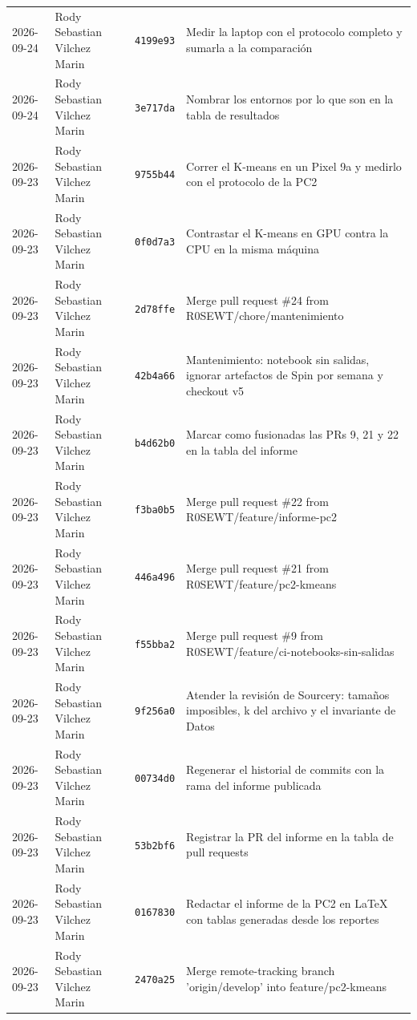 {\begin{xltabular}{\textwidth}{@{}L{2cm}L{2.9cm}L{1.5cm}Y@{}}
2026-09-24 & Rody Sebastian Vilchez Marin & \texttt{4199e93} & Medir la laptop con el protocolo completo y sumarla a la comparación \\
2026-09-24 & Rody Sebastian Vilchez Marin & \texttt{3e717da} & Nombrar los entornos por lo que son en la tabla de resultados \\
2026-09-23 & Rody Sebastian Vilchez Marin & \texttt{9755b44} & Correr el K-means en un Pixel 9a y medirlo con el protocolo de la PC2 \\
2026-09-23 & Rody Sebastian Vilchez Marin & \texttt{0f0d7a3} & Contrastar el K-means en GPU contra la CPU en la misma máquina \\
2026-09-23 & Rody Sebastian Vilchez Marin & \texttt{2d78ffe} & Merge pull request \#24 from R0SEWT/chore/mantenimiento \\
2026-09-23 & Rody Sebastian Vilchez Marin & \texttt{42b4a66} & Mantenimiento: notebook sin salidas, ignorar artefactos de Spin por semana y checkout v5 \\
2026-09-23 & Rody Sebastian Vilchez Marin & \texttt{b4d62b0} & Marcar como fusionadas las PRs 9, 21 y 22 en la tabla del informe \\
2026-09-23 & Rody Sebastian Vilchez Marin & \texttt{f3ba0b5} & Merge pull request \#22 from R0SEWT/feature/informe-pc2 \\
2026-09-23 & Rody Sebastian Vilchez Marin & \texttt{446a496} & Merge pull request \#21 from R0SEWT/feature/pc2-kmeans \\
2026-09-23 & Rody Sebastian Vilchez Marin & \texttt{f55bba2} & Merge pull request \#9 from R0SEWT/feature/ci-notebooks-sin-salidas \\
2026-09-23 & Rody Sebastian Vilchez Marin & \texttt{9f256a0} & Atender la revisión de Sourcery: tamaños imposibles, k del archivo y el invariante de Datos \\
2026-09-23 & Rody Sebastian Vilchez Marin & \texttt{00734d0} & Regenerar el historial de commits con la rama del informe publicada \\
2026-09-23 & Rody Sebastian Vilchez Marin & \texttt{53b2bf6} & Registrar la PR del informe en la tabla de pull requests \\
2026-09-23 & Rody Sebastian Vilchez Marin & \texttt{0167830} & Redactar el informe de la PC2 en LaTeX con tablas generadas desde los reportes \\
2026-09-23 & Rody Sebastian Vilchez Marin & \texttt{2470a25} & Merge remote-tracking branch 'origin/develop' into feature/pc2-kmeans \\

\end{xltabular}}
